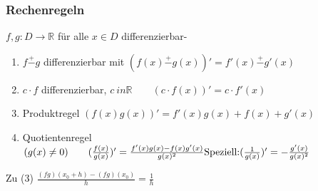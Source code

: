 \subsubsection*{Rechenregeln} %
\label{sub:rechenregeln}

\( f,g:D\rightarrow\mathbb{R} \) für alle \( x \in D \) differenzierbar-

\begin{enumerate}
	\item \( f \stackrel{+}{-} g \) differenzierbar mit \( (f(x)\stackrel{+}{-}g(x))'=f'(x)\stackrel{+}{-}g'(x) \)
	\item \( c \cdot f \) differenzierbar, \( c \ in \mathbb{R} \qquad (c \cdot f(x))'=c\cdot f'(x) \)
	\item Produktregel \( (f(x)g(x))' = f'(x)g(x)+f(x)+g'(x) \)
	\item Quotientenregel \( (g(x) \neq 0) \qquad (\frac{f(x)}{g(x)})'=\frac{f'(x)g(x)-f(x)g'(x)}{g(x)^2} \newline\text{Speziell:} (\frac{1}{g(x)})'=-\frac{g'(x)}{g(x)^2}\)
\end{enumerate}

Zu (3) \( \frac{(fg)(x_0+h)-(fg)(x_0)}{h}=\frac{1}{h} \)
